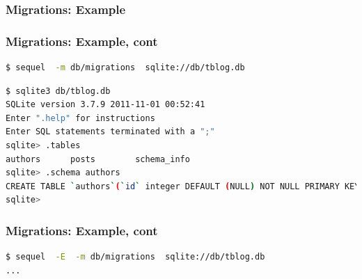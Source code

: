 \documentclass{beamer}
\begin{document}
\begin{frame}\frametitle{Migrations: Example} 

  

\end{frame}




\begin{frame}[fragile]\frametitle{Migrations: Example, cont} 

  \begin{lstlisting}[language=bash, escapechar={^}]
$ sequel  -m db/migrations  sqlite://db/tblog.db
  \end{lstlisting}

  \begin{lstlisting}[language=bash, escapechar={^}]
$ sqlite3 db/tblog.db
SQLite version 3.7.9 2011-11-01 00:52:41
Enter ".help" for instructions
Enter SQL statements terminated with a ";"
sqlite> .tables
authors      posts        schema_info
sqlite> .schema authors
CREATE TABLE `authors`(`id` integer DEFAULT (NULL) NOT NULL PRIMARY KEY, `name` varchar(255) DEFAULT (NULL) NULL);
sqlite> 
  \end{lstlisting}


\end{frame}




\begin{frame}[fragile]\frametitle{Migrations: Example, cont} 

  

  \begin{lstlisting}[language=bash, escapechar={^}]
$ sequel  -E  -m db/migrations  sqlite://db/tblog.db
...
  \end{lstlisting}
  
\end{frame}
\end{document}
